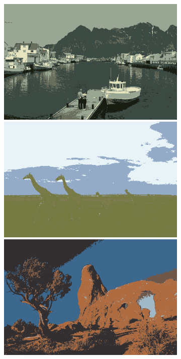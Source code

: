 \documentclass[11pt,a4paper]{article}
\begin{document}
\begin{figure}
    \centering
    \begin{subfigure}[b]{0.24\textwidth}
        \centering
        \includegraphics[width=\textwidth]{figures/sampling_rate/0.001/219090_avg.png}
        \includegraphics[width=\textwidth]{figures/sampling_rate/0.001/253055_avg.png}
        \includegraphics[width=\textwidth]{figures/sampling_rate/0.001/295087_avg.png}

\end{subfigure}
\end{figure}
\end{document}
